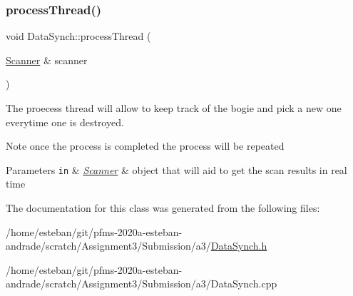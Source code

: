 \subsubsection{\texorpdfstring{process\+Thread()}{processThread()}}
{\footnotesize\ttfamily void Data\+Synch\+::process\+Thread (\begin{DoxyParamCaption}\item[{\hyperlink{classScanner}{Scanner} \&}]{scanner }\end{DoxyParamCaption})}



The proecess thread will allow to keep track of the bogie and pick a new one everytime one is destroyed. 

\begin{DoxyNote}{Note}
once the process is completed the process will be repeated 
\end{DoxyNote}

\begin{DoxyParams}[1]{Parameters}
\mbox{\tt in}  & {\em \hyperlink{classScanner}{Scanner}} & object that will aid to get the scan results in real time \\
\hline
\end{DoxyParams}


The documentation for this class was generated from the following files\+:\begin{DoxyCompactItemize}
\item 
/home/esteban/git/pfms-\/2020a-\/esteban-\/andrade/scratch/\+Assignment3/\+Submission/a3/\hyperlink{DataSynch_8h}{Data\+Synch.\+h}\item 
/home/esteban/git/pfms-\/2020a-\/esteban-\/andrade/scratch/\+Assignment3/\+Submission/a3/Data\+Synch.\+cpp\end{DoxyCompactItemize}
